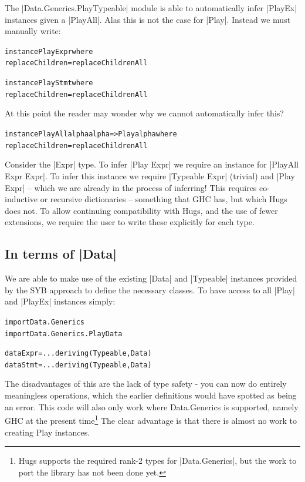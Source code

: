 \documentclass[preprint]{sigplanconf}
\newenvironment{code}{\begin{alltt}\small}{\end{alltt}}
\begin{document}
The |Data.Generics.PlayTypeable| module is able to automatically infer |PlayEx| instances given a |PlayAll|. Alas this is not the case for |Play|. Instead we must manually write:

\begin{code}
instance Play Expr where
    replaceChildren = replaceChildrenAll

instance Play Stmt where
    replaceChildren = replaceChildrenAll
\end{code}

At this point the reader may wonder why we cannot automatically infer this?

\begin{code}
instance PlayAll alpha alpha => Play alpha where
    replaceChildren = replaceChildrenAll
\end{code}

Consider the |Expr| type. To infer |Play Expr| we require an instance for |PlayAll Expr Expr|. To infer this instance we require |Typeable Expr| (trivial) and |Play Expr| -- which we are already in the process of inferring! This requires co-inductive or recursive dictionaries -- something that GHC has, but which Hugs does not. To allow continuing compatibility with Hugs, and the use of fewer extensions, we require the user to write these explicitly for each type.


\subsection{In terms of |Data|}
\label{sec:implement_playdata}

We are able to make use of the existing |Data| and |Typeable| instances provided by the SYB approach to define the necessary classes. To have access to all |Play| and |PlayEx| instances simply:

\begin{code}
import Data.Generics
import Data.Generics.PlayData

data Expr  = ... \? \? deriving (Typeable, Data)
data Stmt  = ... \? \? deriving (Typeable, Data)
\end{code}

The disadvantages of this are the lack of type safety - you can now do entirely meaningless operations, which the earlier definitions would have spotted as being an error. This code will also only work where Data.Generics is supported, namely GHC at the present time\footnote{Hugs supports the required rank-2 types for |Data.Generics|, but the work to port the library has not been done yet.} The clear advantage is that there is almost no work to creating Play instances.
\end{document}
